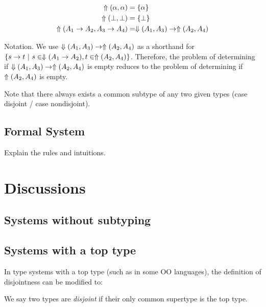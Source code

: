 \documentclass[nocopyrightspace,preprint,times,9pt]{sigplanconf}
\begin{document}
\begin{align*}
  \Uparrow(\alpha,\alpha) &= \{ \alpha \} \\
  \Uparrow(\bot,\bot) &= \{ \bot \} \\
  \Uparrow(A_1 \to A_2, A_3 \to A_4) &= \Downarrow(A_1,A_3) \to \Uparrow(A_2,A_4) \\
\end{align*}

Notation. We use $\Downarrow(A_1,A_3) \to \Uparrow(A_2,A_4)$ as a shorthand for $\{ s \to t ~|~ s \in \Downarrow(A_1 \to A_2), t \in \Uparrow(A_2,A_4) \}$. Therefore, the problem of determining if $\Downarrow(A_1,A_3) \to \Uparrow(A_2,A_4)$ is empty reduces to the problem of determining if $\Uparrow(A_2,A_4)$ is empty.

Note that there always exists a common subtype of any two given types (case disjoint / case nondisjoint).

\subsection{Formal System}

Explain the rules and intuitions.

\section{Discussions}

\subsection{Systems without subtyping}

\subsection{Systems with a top type}

In type systems with a top type (such as \lstinline@Object@ in some OO languages), the definition of disjointness can be modified to:

We say two types are \emph{disjoint} if their only common supertype is the top type.




\end{document}
